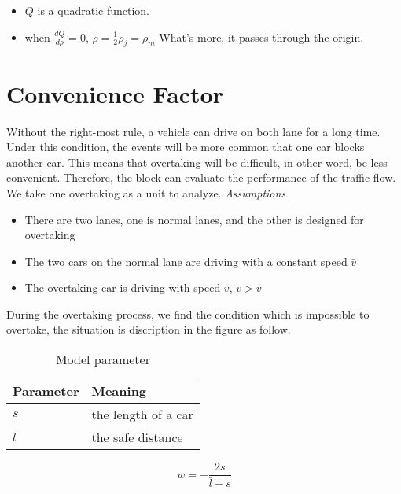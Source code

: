 \begin{itemize}
\item $Q$ is a quadratic function. 
\item when $\frac{dQ}{d \rho} = 0$, 
$\rho = \frac{1}{2}\rho_j = \rho_m $
What's more, it passes through the origin.
\end{itemize}




\section{Convenience Factor}\label{sec: Convenience Factor}
Without the right-most rule, a vehicle can drive on both lane for a long time. Under this condition, the events will be more common that one car blocks another car. This means that overtaking will be difficult,
in other word, be less convenient. Therefore, the block can evaluate the performance of the traffic flow.
We take one overtaking as a unit to
analyze. 
\emph{Assumptions}
\begin{itemize}
\item There are two lanes, one is normal lanes,
and the other is designed for overtaking
\item The two cars on the normal lane are driving
with a constant speed $\bar{v}$
\item The overtaking car is driving with speed
$v$, $v > \bar{v}$
\end{itemize}

During the overtaking
process, we find the condition which
is impossible to overtake, the situation
is discription in the figure as follow.

\begin{table}
\centering
\begin{tabular}{ll}
\hline
Parameter & Meaning\\
\hline
$s$ & the length of a car \\
$l$ & the safe distance \\
\hline
\end{tabular}
\caption{Model parameter}
\end{table}

\begin{equation}
w = - \frac{2s}{\bar{l} + s} 
\end{equation}
  
